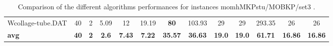 \begin{table}[h]
{\begin{tabular}{lcccccccccccc}
Wcollage-tube.DAT & 40 & 2 &  \textcolor{blue2}{5.09} & 12 & 19.19 &  \textbf{80} & 103.93 & 29 & 29 & 293.35 & 26 & 26 \\
\cline{1-13} \textbf{avg} & \textbf{40} & \textbf{2} & \textbf{2.6} & \textbf{7.43} & \textbf{7.22} & \textbf{35.57} & \textbf{36.63} & \textbf{19.0} & \textbf{19.0} & \textbf{61.71} & \textbf{16.86} & \textbf{16.86} \\ \cline{1-13}
\bottomrule
\end{tabular}
}%
\caption{Comparison of the different algorithms performances for instances momhMKPstu/MOBKP/set3 .}
\label{tab:table_compare_momhMKPstu/MOBKP/set3 }
\end{table}
